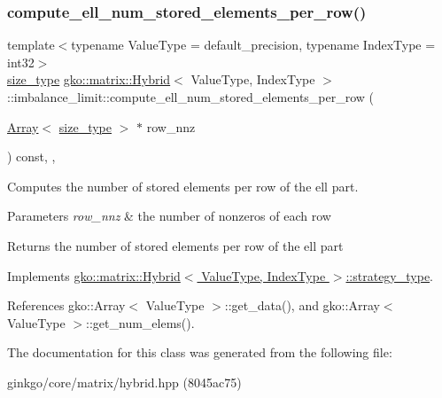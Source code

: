 \subsubsection{\texorpdfstring{compute\+\_\+ell\+\_\+num\+\_\+stored\+\_\+elements\+\_\+per\+\_\+row()}{compute\_ell\_num\_stored\_elements\_per\_row()}}
{\footnotesize\ttfamily template$<$typename Value\+Type = default\+\_\+precision, typename Index\+Type = int32$>$ \\
\hyperlink{namespacegko_a6e5c95df0ae4e47aab2f604a22d98ee7}{size\+\_\+type} \hyperlink{classgko_1_1matrix_1_1Hybrid}{gko\+::matrix\+::\+Hybrid}$<$ Value\+Type, Index\+Type $>$\+::imbalance\+\_\+limit\+::compute\+\_\+ell\+\_\+num\+\_\+stored\+\_\+elements\+\_\+per\+\_\+row (\begin{DoxyParamCaption}\item[{\hyperlink{classgko_1_1Array}{Array}$<$ \hyperlink{namespacegko_a6e5c95df0ae4e47aab2f604a22d98ee7}{size\+\_\+type} $>$ $\ast$}]{row\+\_\+nnz }\end{DoxyParamCaption}) const\hspace{0.3cm}{\ttfamily [inline]}, {\ttfamily [override]}, {\ttfamily [virtual]}}



Computes the number of stored elements per row of the ell part. 


\begin{DoxyParams}{Parameters}
{\em row\+\_\+nnz} & the number of nonzeros of each row\\
\hline
\end{DoxyParams}
\begin{DoxyReturn}{Returns}
the number of stored elements per row of the ell part 
\end{DoxyReturn}


Implements \hyperlink{classgko_1_1matrix_1_1Hybrid_1_1strategy__type_a0a0cd4024f27c7d0f286f35fc0a6de60}{gko\+::matrix\+::\+Hybrid$<$ Value\+Type, Index\+Type $>$\+::strategy\+\_\+type}.



References gko\+::\+Array$<$ Value\+Type $>$\+::get\+\_\+data(), and gko\+::\+Array$<$ Value\+Type $>$\+::get\+\_\+num\+\_\+elems().



The documentation for this class was generated from the following file\+:\begin{DoxyCompactItemize}
\item 
ginkgo/core/matrix/hybrid.\+hpp (8045ac75)\end{DoxyCompactItemize}
